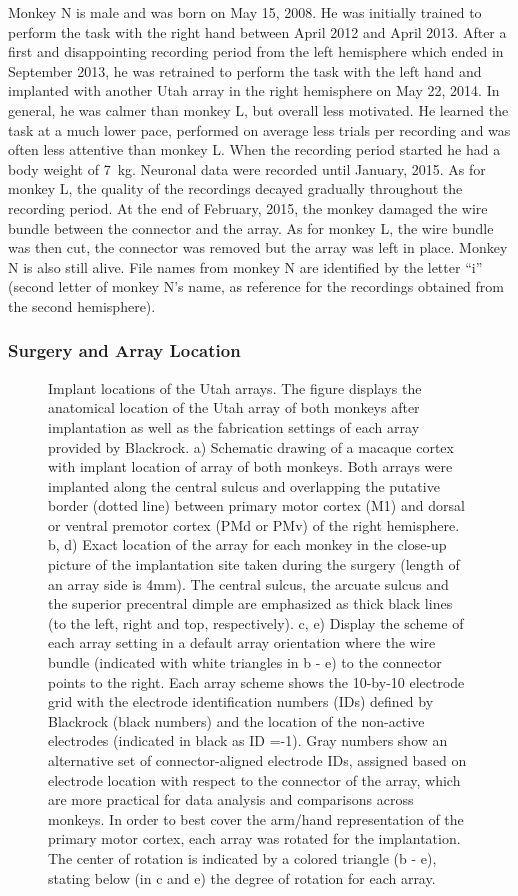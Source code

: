 Monkey N is male and was born on May 15, 2008. He was initially trained to perform the task with the right hand between April 2012 and April 2013. After a first and disappointing recording period from the left hemisphere which ended in September 2013, he was retrained to perform the task with the left hand and implanted with another Utah array in the right hemisphere on May 22, 2014. In general, he was calmer than monkey L, but overall less motivated. He learned the task at a much lower pace, performed on average less trials per recording and was often less attentive than monkey L. When the recording period started he had a body weight of 7 kg. Neuronal data were recorded until January, 2015. As for monkey L, the quality of the recordings decayed gradually throughout the recording period. At the end of February, 2015, the monkey damaged the wire bundle between the connector and the array. As for monkey L, the wire bundle was then cut, the connector was removed but the array was left in place. Monkey N is also still alive. File names from monkey N are identified by the letter “i” (second letter of monkey N’s name, as reference for the recordings obtained from the second hemisphere). 

\subsubsection{Surgery and Array Location}

\begin{figure}
\caption[Implant locations of the Utah arrays]{Implant locations of the Utah arrays. The figure displays the anatomical location of the Utah array of both monkeys after implantation as well as the fabrication settings of each array provided by Blackrock. a) Schematic drawing of a macaque cortex with implant location of array of both monkeys. Both arrays were implanted along the central sulcus and overlapping the putative border (dotted line) between primary motor cortex (M1) and dorsal or ventral premotor cortex (PMd or PMv) of the right hemisphere. b, d) Exact location of the array for each monkey in the close-up picture of the implantation site taken during the surgery (length of an array side is 4mm). The central sulcus, the arcuate sulcus and the superior precentral dimple are emphasized as thick black lines (to the left, right and top, respectively). c, e) Display the scheme of each array setting in a default array orientation where the wire bundle (indicated with white triangles in b - e) to the connector points to the right. Each array scheme shows the 10-by-10 electrode grid with the electrode identification numbers (IDs) defined by Blackrock (black numbers) and the location of the non-active electrodes (indicated in black as ID =-1). Gray numbers show an alternative set of connector-aligned electrode IDs, assigned based on electrode location with respect to the connector of the array, which are more practical for data analysis and comparisons across monkeys. In order to best cover the arm/hand representation of the primary motor cortex, each array was rotated for the implantation. The center of rotation is indicated by a colored triangle (b - e), stating below (in c and e) the degree of rotation for each array.}
\end{figure}


